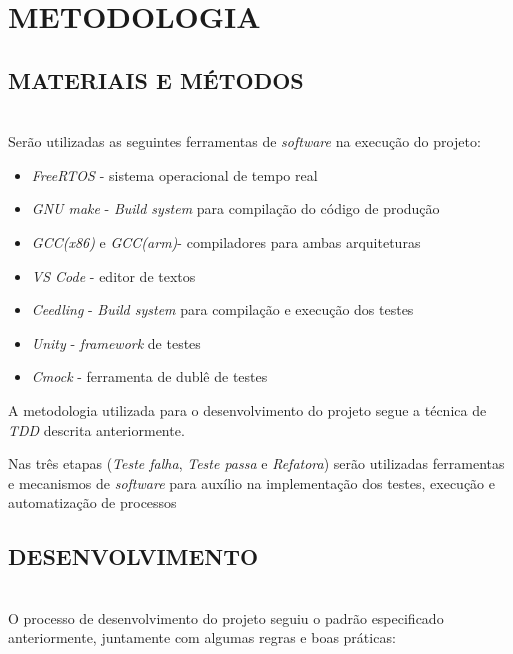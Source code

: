 \documentclass[times, twoside, watermark]{artigo}
\begin{document}
\section{METODOLOGIA}

\subsection{MATERIAIS E MÉTODOS}\hfill\\

Serão utilizadas as seguintes ferramentas de \textit{software} na execução do projeto:

\begin{itemize}
  \item \textit{FreeRTOS} - sistema operacional de tempo real
  \item \textit{GNU make} - \textit{Build system} para compilação do código de produção
  \item \textit{GCC(x86)} e \textit{GCC(arm)}- compiladores para ambas arquiteturas
  \item \textit{VS Code} - editor de textos
  \item \textit{Ceedling} - \textit{Build system} para compilação e execução dos testes
  \item \textit{Unity} - \textit{framework} de testes
  \item \textit{Cmock} - ferramenta de dublê de testes
\end{itemize}

A metodologia utilizada para o desenvolvimento do projeto segue a técnica de
\textit{TDD} descrita anteriormente.

Nas três etapas (\textit{Teste falha}, \textit{Teste passa}
e \textit{Refatora}) serão utilizadas ferramentas e mecanismos de \textit{software}
para auxílio na implementação dos testes, execução e automatização de processos \hfill\


\subsection{DESENVOLVIMENTO}\hfill\\

O processo de desenvolvimento do projeto seguiu o padrão especificado anteriormente,
juntamente com algumas regras e boas práticas:
\end{document}
